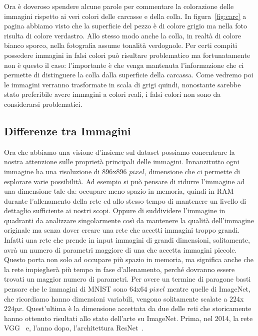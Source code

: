 Ora è doveroso spendere alcune parole per commentare la colorazione delle immagini rispetto ai veri colori delle carcasse e della colla.
In figura~\ref{fig:carc} a pagina \pageref{fig:carc} abbiamo visto che la superficie del pezzo è di colore grigio ma nella foto risulta di colore verdastro.
Allo stesso modo anche la colla, in realtà di colore bianco sporco, nella fotografia assume tonalità verdognole.
Per certi compiti possedere immagini in falsi colori può risultare problematico ma fortunatamente non è questo il caso: l'importante è che venga mantenuta l'informazione che ci permette di distinguere la colla dalla superficie della carcassa.
Come vedremo poi le immagini verranno trasformate in scala di grigi quindi, nonostante sarebbe stato preferibile avere immagini a colori reali, i falsi colori non sono da considerarsi problematici.

\subsection{Differenze tra Immagini}
Ora che abbiamo una visione d'insieme sul dataset possiamo concentrare la nostra attenzione sulle proprietà principali delle immagini.
Innanzitutto ogni immagine ha una risoluzione di $896$x$896$ $pixel$, dimensione che ci permette di esplorare varie possibilità.
Ad esempio si può pensare di ridurre l'immagine ad una dimensione tale da: occupare meno spazio in memoria, quindi in RAM durante l'allenamento della rete ed allo stesso tempo di mantenere un livello di dettaglio sufficiente ai nostri scopi.
Oppure di suddividere l'immagine in quadranti da analizzare singolarmente così da mantenere la qualità dell'immagine originale ma senza dover creare una rete che accetti immagini troppo grandi.
Infatti una rete che prende in input immagini di grandi dimensioni, solitamente, avrà un numero di parametri maggiore di una che accetta immagini piccole.
Questo porta non solo ad occupare più spazio in memoria, ma significa anche che la rete impiegherà più tempo in fase d'allenamento, perché dovranno essere trovati un maggior numero di parametri.
Per avere un termine di paragone basti pensare che le immagini di MNIST sono $64$x$64$ $pixel$ mentre quelle di ImageNet, che ricordiamo hanno dimensioni variabili, vengono solitamente scalate a $224$x$224px$.
Quest'ultima è la dimensione accettata da due delle reti che storicamente hanno ottenuto risultati allo stato dell'arte su ImageNet.
Prima, nel 2014, la rete VGG~\cite{vgg} e, l'anno dopo, l'architettura ResNet~\cite{resnet}.

